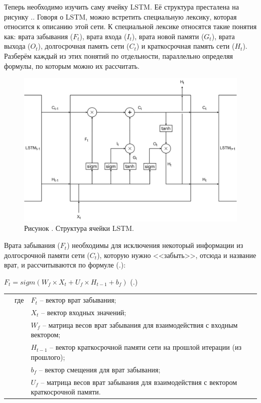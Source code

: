{  \par \redline Теперь необходимо изучить саму ячейку LSTM. Её структура престалена на рисунку \thechaptercntr .\theimagecntr. Говоря о LSTM, можно встретить специальную лексику, которая относится к описанию этой сети. К специальной лексике относятся такие понятия как: врата забывания ($F_t$), врата входа ($I_t$), врата новой памяти ($G_t$), врата выхода ($O_t$), долгосрочная память сети ($C_t$) и краткосрочная память сети ($H_t$). Разберём каждый из этих понятий по отдельности, параллельно определяя формулы, по которым можно их рассчитать.

  \begin{figure}
    \centering
    \def\svgwidth{\textwidth}
    \includegraphics[scale=0.225]{../GMs/Pl2/LSTM.png}
    \caption*{\gostFont Рисунок \thechaptercntr .\theimagecntr \spc {--} Структура ячейки LSTM.}
    \label{fig:LSTM}
  \end{figure} \addtocounter{imagecntr}{1}

  \par \redline Врата забывания ($F_t$) необходимы для исключения некоторый информации из долгосрочной памяти сети ($C_t$), которую нужно <<забыть>>, отсюда и название врат, и рассчитываются по формуле (\thechaptercntr .\theformulacntr):

  \formulaspace \par \redline 
    $F_t = sigm(W_f \times X_t + U_f \times H_{t-1} + b_f)$
    \hfill (\thechaptercntr .\theformulacntr) \redline
  \formulaspace \addtocounter{formulacntr}{1}

  \begin{tabular}{p{}p{}p{}}
		& где  & $F_t$ {--} вектор врат забывания; \\
    & 	   & $X_t$ {--} вектор входных значений; \\
		& 	   & $W_f$ {--} матрица весов врат забывания для взаимодействия с входным вектором; \\
    & 	   & $H_{t-1}$ {--} вектор краткосрочной памяти сети на прошлой итерации (из прошлого); \\
    & 	   & $b_f$ {--} вектор смещения для врат забывания; \\
    & 	   & $U_f$ {--} матрица весов врат забывания для взаимодействия с вектором краткосрочной памяти. \\
  \end{tabular}

}
